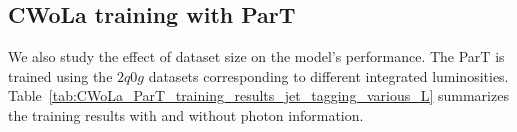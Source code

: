 \documentclass[12pt]{article}
\begin{document}
    \subsection{CWoLa training with ParT}%
    \label{sub:cwola_training_with_part}
        We also study the effect of dataset size on the model's performance. The ParT is trained using the $2q0g$ datasets corresponding to different integrated luminosities. Table~\ref{tab:CWoLa_ParT_training_results_jet_tagging_various_L} summarizes the training results with and without photon information.
        \begin{table}[htpb]
            \centering
            \caption{ParT training results with different dataset sizes corresponding to various luminosities. The ACC and AUC are evaluated over 10 training runs.}
            \label{tab:CWoLa_ParT_training_results_jet_tagging_various_L}
             \\
\end{table}
\end{document}
